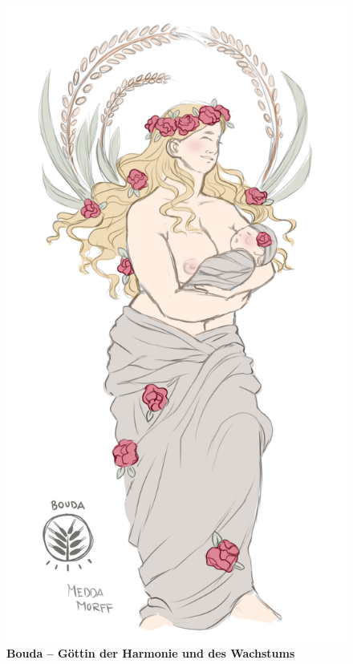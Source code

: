 \begin{figure}[tbh]
	\begin{minipage}{0.44\textwidth}
		\centering
		\includegraphics[width=0.94\linewidth]{Abbildungen/Gesellschaft/Religion/bouda}
		\captionsetup{width=0.95\linewidth}
		\caption[Bouda -- Göttin der Harmonie und des Wachstums]{\textbf{Bouda -- Göttin der Harmonie und des Wachstums}}
		\label{fig:bouda}
	\end{minipage}
	\hfill
	\begin{minipage}{0.54\textwidth}

\end{minipage}
\end{figure}
